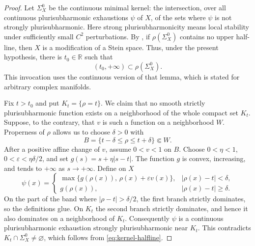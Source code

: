 \documentclass[11pt]{amsart}
\theoremstyle{definition}
\theoremstyle{remark}
\numberwithin{equation}{section}
\begin{document}
\begin{proof}
Let $\Sigma_X^0$ be the continuous minimal kernel: the intersection,
over all continuous plurisubharmonic exhaustions $\psi$ of $X$, of
the sets where $\psi$ is not strongly plurisubharmonic.  Here strong
plurisubharmonicity means local stability under sufficiently small
$C^2$ perturbations.  By \cite[Lemma~2.1]{MongodiSlodkowski2020}, if
$\rho(\Sigma_X^0)$ contains no upper half-line, then $X$ is a
modification of a Stein space.  Thus, under the present hypothesis,
there is $t_0\in\mathbb R$ such that
\begin{equation}
\label{eq:kernel-halfline}
 (t_0,+\infty)\subset\rho(\Sigma_X^0).
\end{equation}
This invocation uses the continuous version of that lemma, which is
stated for arbitrary complex manifolds.

Fix $t>t_0$ and put $K_t=\{\rho=t\}$.  We claim that no smooth
strictly plurisubharmonic function exists on a neighborhood of the
whole compact set $K_t$.  Suppose, to the contrary, that $v$ is such
a function on a neighborhood $W$.  Properness of $\rho$ allows us
to choose $\delta>0$ with
\[
 B=\{t-\delta\leq\rho\leq t+\delta\}\Subset W.
\]
After a positive affine change of $v$, assume $0<v<1$ on $B$.
Choose $0<\eta<1$, $0<\varepsilon<\eta\delta/2$, and set
$g(s)=s+\eta|s-t|$.  The function $g$ is convex, increasing, and
tends to $+\infty$ as $s\to+\infty$.  Define on $X$
\[
 \psi(x)=
 \begin{cases}
  \max\{g(\rho(x)),\,\rho(x)+\varepsilon v(x)\},
       & |\rho(x)-t|<\delta,\\
  g(\rho(x)),& |\rho(x)-t|\geq\delta.
 \end{cases}
\]
On the part of the band where $|\rho-t|>\delta/2$, the first branch
strictly dominates, so the definitions glue.  On $K_t$ the second
branch strictly dominates, and hence it also dominates on a
neighborhood of $K_t$.  Consequently $\psi$ is a continuous
plurisubharmonic exhaustion strongly plurisubharmonic near $K_t$.
This contradicts $K_t\cap\Sigma_X^0\ne\varnothing$, which follows
from \eqref{eq:kernel-halfline}.


\end{proof}
\end{document}
